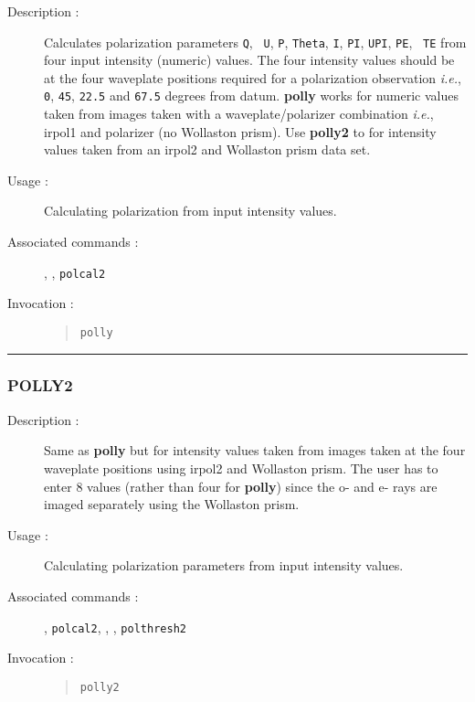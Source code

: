 \begin{description}

\item[Description :] Calculates polarization parameters {\tt Q}, {\tt
U}, {\tt P}, {\tt Theta}, {\tt I}, {\tt PI}, {\tt UPI}, {\tt PE}, {\tt
TE} from four input intensity (numeric) values.  The four intensity
values should be at the four waveplate positions required for a
polarization observation \emph{i.e.}, {\tt 0}, {\tt 45}, {\tt 22.5} and
{\tt 67.5} degrees from datum.  {\bf polly} works for numeric values
taken from images taken with a waveplate/polarizer combination
\emph{i.e.}, {\sc irpol1} and polarizer (no Wollaston prism).  Use {\bf
polly2} to for intensity values taken from an {\sc irpol2} and Wollaston
prism data set.

\item[Usage :] Calculating polarization from input intensity values.

\item[Associated commands :] {\tt {}}, 
{\tt {}}, {\tt polcal2}

\item[Invocation :]

\begin{quote}{\tt  polly }\end{quote}

\end{description}

\hrule 
\subsubsection*{\label{POLLY2}POLLY2}

\begin{description}

\item[Description :] Same as {\bf polly} but for intensity values taken
from images taken at the four waveplate positions using {\sc irpol2}
and Wollaston prism.  The user has to enter 8 values (rather than four
for {\bf polly}) since the o- and e- rays are imaged separately using
the Wollaston prism.

\item[Usage :] Calculating polarization parameters from input intensity values.

\item[Associated commands :] {\tt {}}, 
{\tt polcal2}, {\tt {}}, 
{\tt {}}, {\tt polthresh2}

\item[Invocation :]

\begin{quote}{\tt  polly2 }\end{quote}

\end{description}

